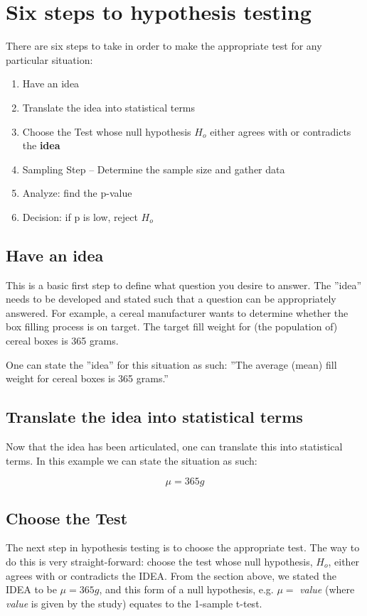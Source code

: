 \section{Six steps to hypothesis testing}
There are six steps to take in order to make the appropriate test for any particular situation:
\begin{enumerate}
\item Have an idea
\item Translate the idea into statistical terms
\item Choose the Test whose null hypothesis $ H_{o} $ either agrees with or contradicts the \textbf{idea}
\item Sampling Step -- Determine the sample size and gather data
\item Analyze: find the p-value 
\item Decision: if p is low, reject $ H_{o} $
\end{enumerate}

\subsection{Have an idea}

This is a basic first step to define what question you desire to answer.  The ''idea'' needs to be developed and stated such that a question can be appropriately answered.  For example, a cereal manufacturer wants to determine whether the box filling process is on target.  The target fill weight for (the population of) cereal boxes is 365 grams.

One can state the ''idea'' for this situation as such: ''The average (mean) fill weight for cereal boxes is 365 grams.''

\subsection{Translate the idea into statistical terms}

Now that the idea has been articulated, one can translate this into statistical terms. In this example we can state the situation as such:

\begin{center}
\begin{equation}
\mu = 365 g
\end{equation}
\end{center}


\subsection{Choose the Test}
The next step in hypothesis testing is to choose the appropriate test.  The way to do this is very straight-forward:  choose the test whose null hypothesis, $H_{o}$, either agrees with or contradicts the IDEA.  From the section above, we stated the IDEA to be $ \mu = 365 g $, and this form of a null hypothesis, e.g. $ \mu = $ \textit{value} (where \textit{value} is given by the study) equates to the 1-sample t-test.  

